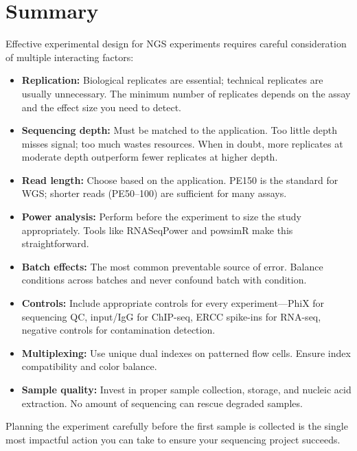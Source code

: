 \section{Summary}
\label{sec:expdesign:summary}

Effective experimental design for NGS experiments requires careful consideration of multiple interacting factors:

\begin{itemize}[itemsep=2pt]
  \item \textbf{Replication:} Biological replicates are essential; technical replicates are usually unnecessary. The minimum number of replicates depends on the assay and the effect size you need to detect.
  \item \textbf{Sequencing depth:} Must be matched to the application. Too little depth misses signal; too much wastes resources. When in doubt, more replicates at moderate depth outperform fewer replicates at higher depth.
  \item \textbf{Read length:} Choose based on the application. PE150 is the standard for WGS; shorter reads (PE50--100) are sufficient for many assays.
  \item \textbf{Power analysis:} Perform before the experiment to size the study appropriately. Tools like RNASeqPower and powsimR make this straightforward.
  \item \textbf{Batch effects:} The most common preventable source of error. Balance conditions across batches and never confound batch with condition.
  \item \textbf{Controls:} Include appropriate controls for every experiment---PhiX for sequencing QC, input/IgG for ChIP-seq, ERCC spike-ins for RNA-seq, negative controls for contamination detection.
  \item \textbf{Multiplexing:} Use unique dual indexes on patterned flow cells. Ensure index compatibility and color balance.
  \item \textbf{Sample quality:} Invest in proper sample collection, storage, and nucleic acid extraction. No amount of sequencing can rescue degraded samples.
\end{itemize}

Planning the experiment carefully before the first sample is collected is the single most impactful action you can take to ensure your sequencing project succeeds.
